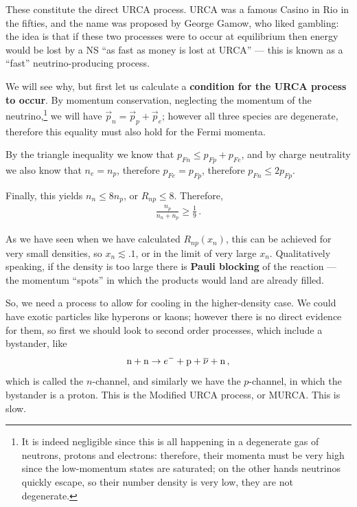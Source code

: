 \documentclass[main.tex]{subfiles}
\begin{document}
These constitute the direct URCA process. 
URCA was a famous Casino in Rio in the fifties, and the name was proposed by George Gamow, who liked gambling: 
the idea is that if these two processes were to occur at equilibrium then energy would be lost by a NS ``as fast as money is lost at URCA'' --- this is known as a ``fast'' neutrino-producing process.

We will see why, but first let us calculate a \textbf{condition for the URCA process to occur}.
By momentum conservation, neglecting the momentum of the neutrino,\footnote{It is indeed negligible since this is all happening in a degenerate gas of neutrons, protons and electrons: therefore, their momenta must be very high since the low-momentum states are saturated; on the other hands neutrinos quickly escape, so their number density is very low, they are not degenerate.} we will have \(\vec{p}_n = \vec{p}_p + \vec{p}_e\); however all three species are degenerate, therefore this equality must also hold for the Fermi momenta. 

By the triangle inequality we know that \(p_{Fn} \leq p_{Fp} + p_{Fe}\), and by charge neutrality we also know that \(n_e = n_p\), therefore  \(p_{Fe} = p_{Fp}\), therefore \(p_{Fn} \leq 2 p_{Fp}\). 

Finally, this yields \(n_n \leq 8 n_p\), or \(R_{np} \leq 8\). Therefore, 
%
\begin{align}
\frac{n_p}{n_n + n_p} \geq \frac{1}{9}
\,.
\end{align}

As we have seen when we have calculated \(R_{np} (x_n)\), this can be achieved for very small densities, so \(x_n \lesssim \num{.1}\), or in the limit of very large \(x_n\).
Qualitatively speaking, if the density is too large there is \textbf{Pauli blocking} of the reaction --- the momentum ``spots'' in which the products would land are already filled. 

So, we need a process to allow for cooling in the higher-density case.
We could have exotic particles like hyperons or kaons; however there is no direct evidence for them, so first we should look to second order processes, which include a bystander, like
%
\begin{align}
\ce{n} + \ce{n} \to e^{-} + \ce{p} + \overline{\nu} + \ce{n}
\,,
\end{align}
%
which is called the \(n\)-channel, and similarly we have the \(p\)-channel, in which the bystander is a proton. 
This is the Modified URCA process, or MURCA. This is slow. 
\end{document}
